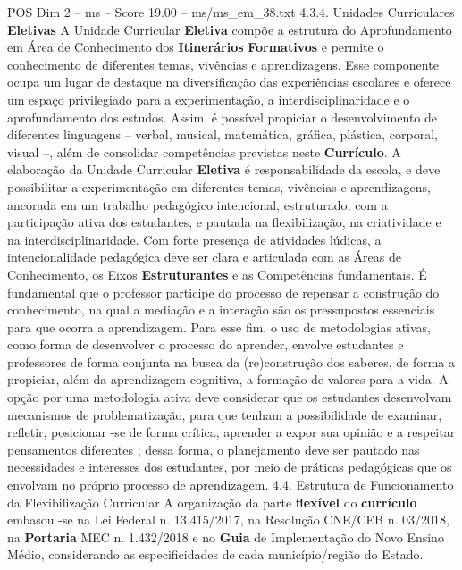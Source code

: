 \begin{textsample}{POS Dim 2 – ms – Score 19.00 – ms/ms\_em\_38.txt}  \label{ex:f2_pos_050}
4.3.4.
Unidades Curriculares \textbf{Eletivas} A Unidade Curricular \textbf{Eletiva} compõe a estrutura do Aprofundamento em Área de Conhecimento dos \textbf{Itinerários} \textbf{Formativos} e permite o conhecimento de diferentes temas, vivências e aprendizagens.
Esse componente ocupa um lugar de destaque na diversificação das experiências escolares e oferece um espaço privilegiado para a experimentação, a interdisciplinaridade e o aprofundamento dos estudos.
Assim, é possível propiciar o desenvolvimento de diferentes linguagens – verbal, musical, matemática, gráfica, plástica, corporal, visual –, além de consolidar competências previstas neste \textbf{Currículo}.
A elaboração da Unidade Curricular \textbf{Eletiva} é responsabilidade da escola, e deve possibilitar a experimentação em diferentes temas, vivências e aprendizagens, ancorada em um trabalho pedagógico intencional, estruturado, com a participação ativa dos estudantes, e pautada na flexibilização, na criatividade e na interdisciplinaridade.
Com forte presença de atividades lúdicas, a intencionalidade pedagógica deve ser clara e articulada com as Áreas de Conhecimento, os Eixos \textbf{Estruturantes} e as Competências fundamentais.
É fundamental que o professor participe do processo de repensar a construção do conhecimento, na qual a mediação e a interação são os pressupostos essenciais para que ocorra a aprendizagem.
Para esse fim, o uso de metodologias ativas, como forma de desenvolver o processo do aprender, envolve estudantes e professores de forma conjunta na busca da (re)construção dos saberes, de forma a propiciar, além da aprendizagem cognitiva, a formação de valores para a vida.
A opção por uma metodologia ativa deve considerar que os estudantes desenvolvam mecanismos de problematização, para que tenham a possibilidade de examinar, refletir, posicionar -se de forma crítica, aprender a expor sua opinião e a respeitar pensamentos diferentes ; dessa forma, o planejamento deve ser pautado nas necessidades e interesses dos estudantes, por meio de práticas pedagógicas que os envolvam no próprio processo de aprendizagem. 4.4.
Estrutura de Funcionamento da Flexibilização Curricular A organização da parte \textbf{flexível} do \textbf{currículo} embasou -se na Lei Federal n. 13.415/2017, na Resolução CNE/CEB n. 03/2018, na \textbf{Portaria} MEC n. 1.432/2018 e no \textbf{Guia} de Implementação do Novo Ensino Médio, considerando as especificidades de cada município/região do Estado.

\end{textsample}
